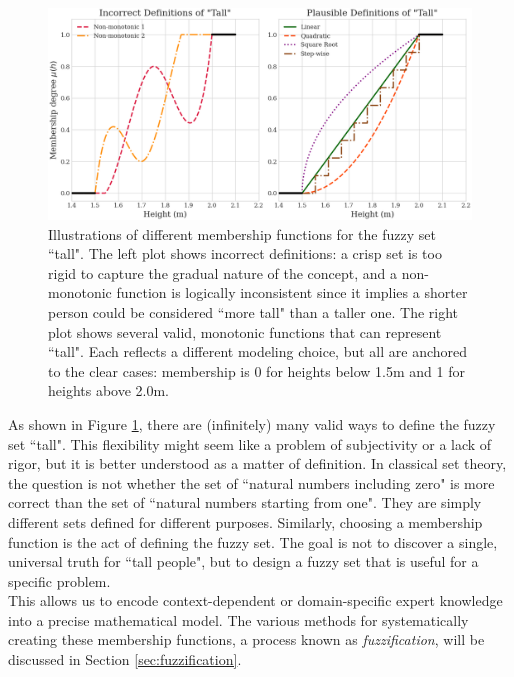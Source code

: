 \begin{figure}[!ht]
    \centering
    \includegraphics[width=\textwidth]{ch1/figures/Fuzzy_tall.png}
    \caption{Illustrations of different membership functions for the fuzzy set ``tall". The left plot shows incorrect definitions: a crisp set is too rigid to capture the gradual nature of the concept, and a non-monotonic function is logically inconsistent since it implies a shorter person could be considered ``more tall" than a taller one. The right plot shows several valid, monotonic functions that can represent ``tall". Each reflects a different modeling choice, but all are anchored to the clear cases: membership is 0 for heights below 1.5m and 1 for heights above 2.0m.}
    \label{fig:tall_definitions}
\end{figure}

As shown in Figure \ref{fig:tall_definitions}, there are (infinitely) many valid ways to define the fuzzy set ``tall". This flexibility might seem like a problem of subjectivity or a lack of rigor, but it is better understood as a matter of definition. In classical set theory, the question is not whether the set of ``natural numbers including zero" is more correct than the set of ``natural numbers starting from one". They are simply different sets defined for different purposes. Similarly, choosing a membership function is the act of defining the fuzzy set. The goal is not to discover a single, universal truth for ``tall people", but to design a fuzzy set that is useful for a specific problem. \\

This allows us to encode context-dependent or domain-specific expert knowledge into a precise mathematical model. The various methods for systematically creating these membership functions, a process known as \textit{fuzzification}, will be discussed in Section \ref{sec:fuzzification}.\\

